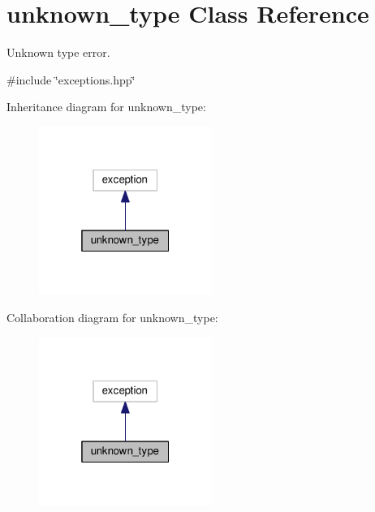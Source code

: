 \hypertarget{classunknown__type}{}\section{unknown\+\_\+type Class Reference}
\label{classunknown__type}


Unknown type error.  




{\ttfamily \#include \char`\"{}exceptions.\+hpp\char`\"{}}



Inheritance diagram for unknown\+\_\+type\+:\nopagebreak
\begin{figure}[H]
\begin{center}
\leavevmode
\includegraphics[width=160pt]{classunknown__type__inherit__graph}
\end{center}
\end{figure}


Collaboration diagram for unknown\+\_\+type\+:\nopagebreak
\begin{figure}[H]
\begin{center}
\leavevmode
\includegraphics[width=160pt]{classunknown__type__coll__graph}
\end{center}
\end{figure}
